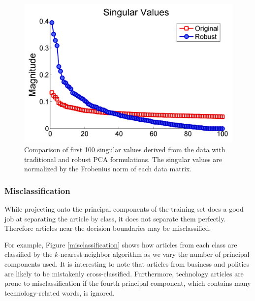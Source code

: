 \documentclass[12pt]{article}
\begin{document}
\begin{figure}[H]
\centering
\includegraphics[width=.6\textwidth]{figures/singularvaluescompare}
\caption{Comparison of first 100 singular values derived from the data with traditional and robust PCA formulations. The singular values are normalized by the Frobenius norm of each data matrix. }
\label{sing_val}
\end{figure}


\subsubsection{Misclassification}
While projecting onto the principal components of the training set does a good job at separating the article by class, it does
not separate them perfectly. Therefore articles near the decision boundaries may be misclassified.

For example, Figure \ref{misclassification} shows how articles from each class are classified by the $k$-nearest neighbor algorithm as we vary the number of principal components used. It is interesting to note that articles from business and politics are likely to be mistakenly cross-classified. Furthermore, technology articles are prone to misclassification if the fourth principal component, which contains many technology-related words, is ignored.
\end{document}
